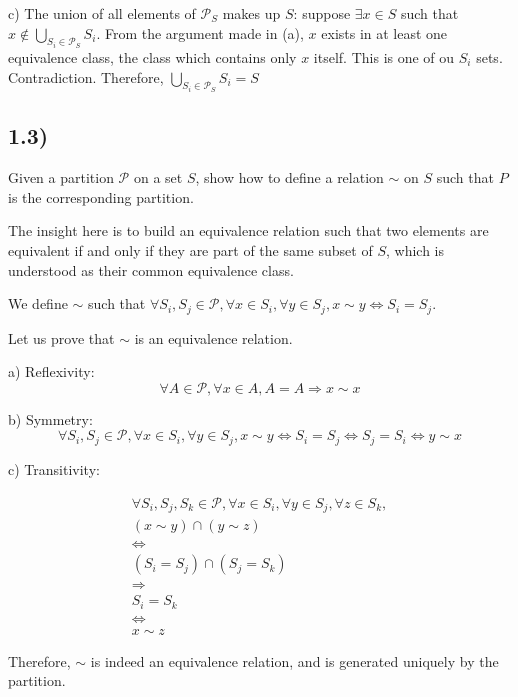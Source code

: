 \documentclass[12pt, letterpaper, twoside]{report}
\begin{document}
c) The union of all elements of $\mathcal{P}_S$ makes up $S$: suppose $\exists x \in S$ such that $x \notin \bigcup_{S_i \in \mathcal{P}_S} S_i$. From the argument made in (a), $x$ exists in at least one equivalence class, the class which contains only $x$ itself. This is one of ou $S_i$ sets. Contradiction. Therefore, $\bigcup_{S_i \in \mathcal{P}_S} S_i = S$



\subsection*{1.3)}

Given a partition $\mathcal{P}$ on a set $S$, show how to define a relation $\sim$ on $S$ such that $P$ is the corresponding partition.

The insight here is to build an equivalence relation such that two elements are equivalent if and only if they are part of the same subset of $S$, which is understood as their common equivalence class.

We define $\sim$ such that $\forall S_i, S_j \in \mathcal{P}, \forall x \in S_i, \forall y \in S_j, x \sim y \Leftrightarrow S_i = S_j$.

Let us prove that $\sim$ is an equivalence relation.

a) Reflexivity:
$$\forall A \in \mathcal{P}, \forall x \in A, A = A \Rightarrow x \sim x$$

b) Symmetry:
$$\forall S_i, S_j \in \mathcal{P}, \forall x \in S_i, \forall y \in S_j, x \sim y \Leftrightarrow S_i = S_j \Leftrightarrow S_j = S_i \Leftrightarrow y \sim x$$

c) Transitivity:

$$
\begin{aligned}
\forall S_i, S_j, S_k \in \mathcal{P}, \forall x \in S_i, \forall y \in S_j, \forall z \in S_k, \\
(x \sim y) \cap (y \sim z) \\
	\Leftrightarrow \\
(S_i = S_j) \cap (S_j = S_k) \\
	\Rightarrow \\
S_i = S_k \\
	\Leftrightarrow \\
x \sim z
\end{aligned}
$$

Therefore, $\sim$ is indeed an equivalence relation, and is generated uniquely by the partition.
\end{document}

